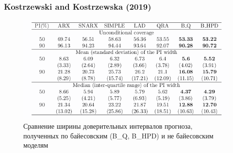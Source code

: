 \documentclass[c, dvipsnames]{beamer}  %
\begin{document}
\begin{frame}[shrink=5]
\frametitle{Kostrzewski and Kostrzewska (2019)} 


\begin{figure}
	\centering
	\includegraphics[width=0.7\linewidth]{screenshot006}
	\caption{Сравнение ширины доверительных интервалов прогноза, полученных по байесовским (B\_Q, B\_HPD) и не байесовским моделям}
	\label{fig:screenshot006}
\end{figure}




\end{frame}






%
%
%
%
%
%
%
%


%
%
%
%
%
%
%
%

%
%
%
%
%
%
%
\end{document}
